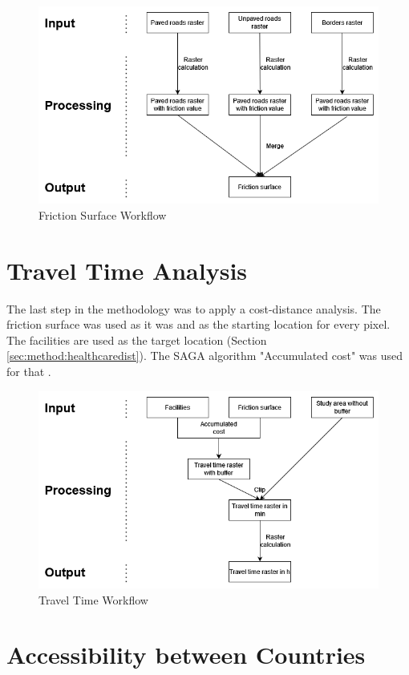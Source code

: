 \documentclass[11pt, a4paper]{report}
\begin{document}
\begin{figure}[H]
  \centering
  \includegraphics[width=0.9\linewidth]{figures/frictionsurfaceworkflow.png}
  \caption{Friction Surface Workflow}
  \label{fig:frictionsurfaceworkflow}
\end{figure}

\section{Travel Time Analysis}\label{sec:method:traveltime}
The last step in the methodology was to apply a cost-distance analysis. The friction surface was used as it was and as the starting location for every pixel. The facilities are used as the target location (Section \ref{sec:method:healthcaredist}). The SAGA algorithm "Accumulated cost" was used for that \citet{conrad_system_2015}.

\begin{figure}[H]
  \centering
  \includegraphics[width=0.9\linewidth]{figures/traveltimeworkflow.png}
  \caption{Travel Time Workflow}
  \label{fig:traveltimeworkflow}
\end{figure}

\section{Accessibility between Countries}\label{sec:method:spatialanalysis}
\end{document}
